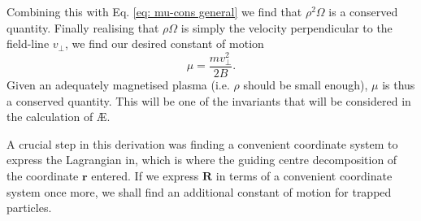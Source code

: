 Combining this with Eq. \eqref{eq: mu-cons general} we find that $\rho^2 \Omega$ is a conserved quantity. Finally realising that $\rho \Omega$ is simply the velocity perpendicular to the field-line $v_\perp$, we find our desired constant of motion
\begin{equation}
    \mu = \frac{m v_\perp^2}{2B}.
\end{equation}
Given an adequately magnetised plasma (i.e. $\rho$ should be small enough), $\mu$ is thus a conserved quantity. This will be one of the invariants that will be considered in the calculation of \AE{}. \par 
A crucial step in this derivation was finding a convenient coordinate system to express the Lagrangian in, which is where the guiding centre decomposition of the coordinate $\boldsymbol{r}$ entered. If we express $\boldsymbol{R}$ in terms of a convenient coordinate system once more, we shall find an additional constant of motion for trapped particles.

